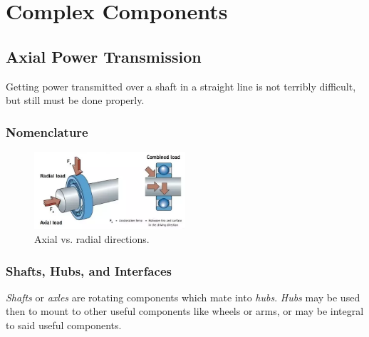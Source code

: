 \documentclass[10pt,letterpaper]{book}
\begin{document}
\chapter{Complex Components}

\section{Axial Power Transmission}

Getting power transmitted over a shaft in a straight line is not terribly difficult, but still must be done properly.

\subsection{Nomenclature}

\begin{figure}[H]
\includegraphics[width=0.5\textwidth]{imgs/radial_axial.png}
\caption{Axial vs. radial directions.}
\end{figure}

\subsection{Shafts, Hubs, and Interfaces}
	
	\textit{Shafts} or \textit{axles} are rotating components which mate into \textit{hubs}. \textit{Hubs} may be used then to mount to other useful components like wheels or arms, or may be integral to said useful components.
\end{document}
